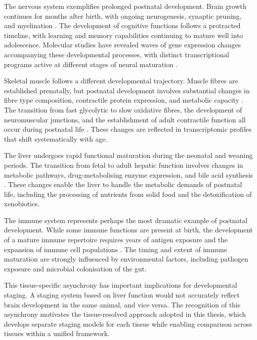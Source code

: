 The nervous system exemplifies prolonged postnatal development. Brain growth continues for months after birth, with ongoing neurogenesis, synaptic pruning, and myelination \parencite{jiang_cellular_2016, kang_spatio-temporal_2011}. The development of cognitive functions follows a protracted timeline, with learning and memory capabilities continuing to mature well into adolescence. Molecular studies have revealed waves of gene expression changes accompanying these developmental processes, with distinct transcriptional programs active at different stages of neural maturation \parencite{kang_spatio-temporal_2011}.

Skeletal muscle follows a different developmental trajectory. Muscle fibres are established prenatally, but postnatal development involves substantial changes in fibre type composition, contractile protein expression, and metabolic capacity \parencite{lefaucheur_pattern_1995}. The transition from fast glycolytic to slow oxidative fibres, the development of neuromuscular junctions, and the establishment of adult contractile function all occur during postnatal life \parencite{lefaucheur_second_2010}. These changes are reflected in transcriptomic profiles that shift systematically with age.

The liver undergoes rapid functional maturation during the neonatal and weaning periods. The transition from fetal to adult hepatic function involves changes in metabolic pathways, drug-metabolising enzyme expression, and bile acid synthesis \parencite{gordillo_orchestrating_2015, si-tayeb_organogenesis_2010}. These changes enable the liver to handle the metabolic demands of postnatal life, including the processing of nutrients from solid food and the detoxification of xenobiotics.

The immune system represents perhaps the most dramatic example of postnatal development. While some immune functions are present at birth, the development of a mature immune repertoire requires years of antigen exposure and the expansion of immune cell populations \parencite{georgountzou_postnatal_2017}. The timing and extent of immune maturation are strongly influenced by environmental factors, including pathogen exposure and microbial colonisation of the gut.

This tissue-specific asynchrony has important implications for developmental staging. A staging system based on liver function would not accurately reflect brain development in the same animal, and vice versa. The recognition of this asynchrony motivates the tissue-resolved approach adopted in this thesis, which develops separate staging models for each tissue while enabling comparison across tissues within a unified framework.

